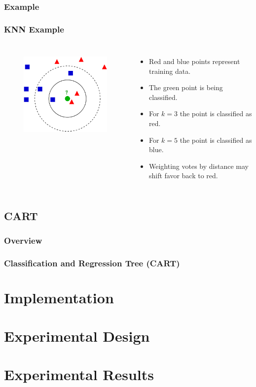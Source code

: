 \documentclass[mathserif]{beamer}
\begin{document}
	\subsubsection{Example}
	\begin{frame}
		\frametitle{KNN Example}
		\begin{columns}[t]
			\begin{figure}
				\centering
				\includegraphics[keepaspectratio,scale=0.5]{KNN.png} \\ \vspace{5px}
			\end{figure}
			
			\begin{itemize}
				\item Red and blue points represent training data.
				\item The green point is being classified.
				\item For \(k=3\) the point is classified as red.
				\item For \(k=5\) the point is classified as blue.
				\item Weighting votes by distance may shift favor back to red.
			\end{itemize}
		\end{columns}
	\end{frame}
	
	\subsection{CART}
	\subsubsection{Overview}
	\begin{frame}
		\frametitle{Classification and Regression Tree (CART)}
	\end{frame}
	
	\section{Implementation}
	
	
	\section{Experimental Design}
	
	
	\section{Experimental Results}
	
	
\end{document}
